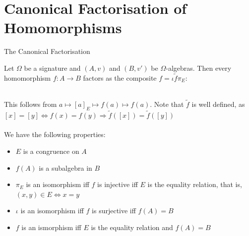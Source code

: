\documentclass{report}
\begin{document}
\newpage

\section{Canonical Factorisation of Homomorphisms}
\begin{thm}{The Canonical Factorisation} {
    Let $\Omega$ be a signature and $(A,v)$ and $(B,v')$ be $\Omega$-algebras. Then every homomorphism $f: A \to B$ factors as the composite $f=\iota\tilde{f} \pi _E$:

 \\
This follows from $a \mapsto [a]_E \mapsto f(a) \mapsto f(a)$. Note that $\tilde{f}$ is well defined, as $[x]=[y] \iff f(x)=f(y) \Rightarrow \tilde{f}([x])=\tilde{f}([y])$  \\ ~\\ We have the following properties:
\begin{itemize}
    \item $E$ is a congruence on $A$
    \item $f(A)$ is a subalgebra in $B$
    \item $\pi_E$ is an isomorphism iff $f$ is injective iff $E$ is the equality relation, that is, $(x,y) \in E \iff x=y$
    \item $\iota $ is an isomorphism iff $f$ is surjective iff $f(A)=B$
    \item $f$ is an ismorphism iff $E$ is the equality relation and $f(A)=B$
\end{itemize}
}


\end{thm}
\end{document}
